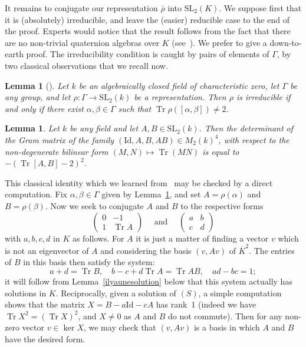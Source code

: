 \documentclass[JEP,XML,SOM,Unicode,NoEqCountersInSection]{cedram}
\newtheorem{lemma}[theorem]{Lemma}
\theoremstyle{definition}
\newcommand{\tr}{\operatorname{Tr}}
\newcommand{\SL}{\mathrm{SL}}
\newcommand{\id}{\mathrm{Id}}
\begin{document}
It remains to conjugate our representation $\overline{\rho}$ into $\SL_2(K)$.
We suppose first that it is (absolutely) irreducible, and leave the (easier)
reducible case to the end of the proof. Experts would notice that the result
follows from the fact that there are no non-trivial quaternion algebras over
$K$ (see~\cite{MaclachlanReid}). We prefer to give a down-to-earth proof.
The irreducibility condition is caught by pairs of elements of $\Gamma$, by
two classical observations that we recall now.
\begin{lemma}[{\cite[Cor.\,1.2.2]{CullerShalen}}]\label{lem:Irred-CS}
Let $k$ be an algebraically closed field of characteristic zero,
let $\Gamma$ be any group, and let $\rho\colon\Gamma\to\SL_2(k)$ be a
representation. Then $\rho$ is irreducible if and only if there exist
$\alpha,\beta\in\Gamma$ such that $\tr \rho([\alpha,\beta])\neq 2$.
\end{lemma}
\begin{lemma}\label{lem:gram}
Let $k$ be any field and let $A,B\in\SL_2(k)$. Then the determinant of the
Gram matrix of the family $(\id,A,B,AB)\in M_2(k)^4$, with respect to the
non-degenerate bilinear form $(M,N)\mapsto\tr(MN)$ is equal to
$- \left(\tr[A,B]-2\right)^2$.
\end{lemma}
This classical identity which we learned from~\cite{Saito} may be checked
by a direct computation. Fix $\alpha,\beta\in \Gamma$ given by
Lemma~\ref{lem:Irred-CS}, and set $A=\rho(\alpha)$ and $B=\rho(\beta)$.
Now we seek to conjugate $A$ and $B$ to the respective forms
\[ \begin{pmatrix} 0 & -1 \\ 1 & \tr A \end{pmatrix}\quad
\text{ and }\quad\begin{pmatrix} a & b \\ c & d\end{pmatrix} \]
with $a,b,c,d$ in $K$ as follows. For $A$ it is just a matter of finding a
vector $v$ which is not an eigenvector of $A$ and considering the basis
$(v,Av)$ of $\overline{K}^2$. The entries of $B$ in this basis then satisfy
the system:
\begin{equation}\tag{S}
a+d=\tr B,\quad b-c+d\tr A=\tr AB,\quad ad-bc=1;
\end{equation}
it will follow from Lemma~\ref{ilyaunesolution} below that this system
actually has solutions in $K$. Reciprocally, given a solution of $(S)$,
a simple computation shows that the matrix $X=B-a\id-c A$ has rank~1
(indeed we have $\tr X^2=(\tr X)^2$, and $X\ne 0$ as $A$ and $B$ do not
commute). Then for any non-zero vector $v\in \ker X$, we may check that
$(v,Av)$ is a basis in which $A$ and $B$ have the desired form.
\end{document}
